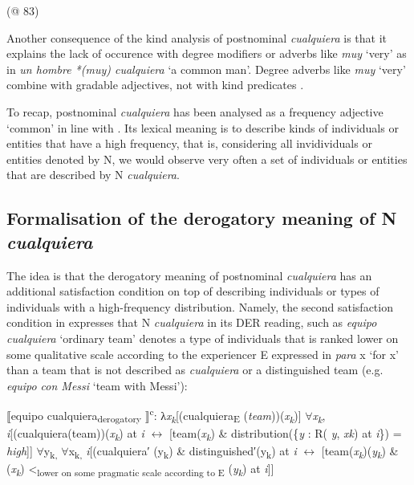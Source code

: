 {  (@ 83)
\z

Another consequence of the kind analysis of postnominal \textit{cualquiera} is that it explains the lack of occurence with degree modifiers or adverbs like \textit{muy} ‘very’ as in \textit{un hombre *(muy) cualquiera} ‘a common man’. Degree adverbs like \textit{muy} ‘very’ combine with gradable adjectives, not with kind predicates \citep{Kennedy1999}.

To recap, postnominal \textit{cualquiera} has been analysed as a frequency adjective ‘common’ in line with \citet{GehrkeMcNally2015}. Its lexical meaning is to describe kinds of individuals or entities that have a high frequency, that is, considering all invidividuals or entities denoted by N, we would observe very often a set of individuals or entities that are described by N \textit{cualquiera}.

\subsection{{Formalisation} {of} {the} {derogatory} {meaning} {of} {N} {\textit{cualquiera}}} \label{sec:3.3.2}

The idea is that the derogatory meaning of postnominal \textit{cualquiera} has an additional satisfaction condition on top of describing individuals or types of individuals with a high-frequency distribution. Namely, the second satisfaction condition in  expresses that N \textit{cualquiera} in its DER reading, such as \textit{equipo cualquiera} ‘ordinary team’ denotes a type of individuals that is ranked lower on some qualitative scale according to the experiencer E expressed in \textit{para} x ‘for x’ than a team that is not described as \textit{cualquiera} or a distinguished team (e.g. \textit{equipo con Messi} ‘team with Messi’):

\ea \label{bkm:Ref58094203} %
⟦equipo cualquiera\textsubscript{derogatory} ⟧\textsuperscript{c}: λ\textit{x\textsubscript{k}}[(cualquiera\textsubscript{E} (\textit{team}))(\textit{x\textsubscript{k}})]
\ea  ${\forall}$\textit{x\textsubscript{k}}, \textit{i}[(cualquiera(team))(\textit{x\textsubscript{k}}) at \textit{i} $\leftrightarrow $ [team(\textit{x\textsubscript{k}}) \& distribution(\{\textit{y} : R( \textit{y}, \textit{xk}) at \textit{i}\}) = \textit{high}]]
\ex \label{bkm:Ref58094203b} ${\forall}$y\textsubscript{k,} ${\forall}$x\textsubscript{k,} \textit{i}[(cualquiera′ (y\textsubscript{k}) \& distinguished′(y\textsubscript{k}) at \textit{i} $\leftrightarrow $ [team(\textit{x\textsubscript{k}})(\textit{y\textsubscript{k}}) \& (\textit{x\textsubscript{k}}) <\textsubscript{lower on some pragmatic scale according to E} (\textit{y\textsubscript{k}}) at \textit{i}]]
\z
\z

}
